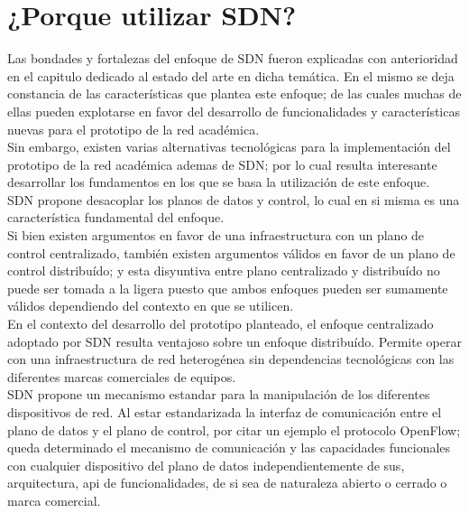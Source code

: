 \section[¿Porque utilizar SDN?]{¿Porque utilizar SDN?}

Las bondades y fortalezas del enfoque de SDN fueron explicadas con anterioridad en el capitulo dedicado al estado del arte en dicha tem\'atica. En el mismo se deja constancia de las caracter\'isticas que plantea este enfoque; de las cuales muchas de ellas pueden explotarse en favor del desarrollo de funcionalidades y caracter\'isticas nuevas para el prototipo de la red acad\'emica.\\

Sin embargo, existen varias alternativas tecnol\'ogicas para la implementaci\'on del prototipo de la red acad\'emica ademas de SDN; por lo cual resulta interesante desarrollar los fundamentos en los que se basa la utilizaci\'on de este enfoque.\\  

SDN propone desacoplar los planos de datos y control, lo cual en si misma es una caracter\'istica fundamental del enfoque.\\ 
Si bien existen argumentos en favor de una infraestructura con un plano de control centralizado, tambi\'en existen argumentos v\'alidos en favor de un plano de control distribu\'ido; y esta disyuntiva entre plano centralizado y distribu\'ido no puede ser tomada a la ligera puesto que ambos enfoques pueden ser sumamente v\'alidos dependiendo del contexto en que se utilicen.\\

En el contexto del desarrollo del prototipo planteado, el enfoque centralizado adoptado por SDN resulta ventajoso sobre un enfoque distribu\'ido. Permite operar con una infraestructura de red heterog\'enea sin dependencias tecnol\'ogicas con las diferentes marcas comerciales de equipos.\\

SDN propone un mecanismo estandar para la manipulaci\'on de los diferentes dispositivos de red. Al estar estandarizada la interfaz de comunicaci\'on entre el plano de datos y el plano de control, por citar un ejemplo el protocolo OpenFlow; queda determinado el mecanismo de comunicaci\'on y las capacidades funcionales con cualquier dispositivo del plano de datos independientemente de sus, arquitectura, api de funcionalidades, de si sea de naturaleza abierto o cerrado o marca comercial.\\ 

